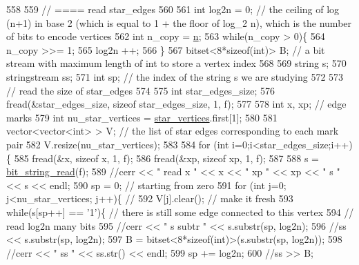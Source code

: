 \begin{DoxyCode}
558 
559   \textcolor{comment}{// ==== read star\_edges}
560 
561   \textcolor{keywordtype}{int} log2n = 0; \textcolor{comment}{// the ceiling of log (n+1) in base 2 (which is equal to 1 + the floor of log\_2 n), which
       is the number of bits to encode vertices}
562   \textcolor{keywordtype}{int} n\_copy = \hyperlink{classmarked__graph__compressed_a8d841016ddb11cfd33748c8deb6277ba}{n};
563   \textcolor{keywordflow}{while}(n\_copy > 0)\{
564     n\_copy >>= 1;
565     log2n ++;
566   \}
567   bitset<8*sizeof(int)> B; \textcolor{comment}{// a bit stream with maximum length of int to store a vertex index}
568 
569   \textcolor{keywordtype}{string} s;
570   stringstream ss;
571   \textcolor{keywordtype}{int} sp; \textcolor{comment}{// the index of the string s we are studying }
572 
573   \textcolor{comment}{// read the size of star\_edges}
574 
575   \textcolor{keywordtype}{int} star\_edges\_size;
576   fread(&star\_edges\_size, \textcolor{keyword}{sizeof} star\_edges\_size, 1, f);
577 
578   \textcolor{keywordtype}{int} x, xp; \textcolor{comment}{// edge marks}
579   \textcolor{keywordtype}{int} nu\_star\_vertices = \hyperlink{classmarked__graph__compressed_a7a4ced4586e2e353f9076bd447df5208}{star\_vertices}.first[1];
580 
581   vector<vector<int> > V; \textcolor{comment}{// the list of star edges corresponding to each mark pair}
582   V.resize(nu\_star\_vertices);
583 
584   \textcolor{keywordflow}{for} (\textcolor{keywordtype}{int} i=0;i<star\_edges\_size;i++)\{
585     fread(&x, \textcolor{keyword}{sizeof} x, 1, f);
586     fread(&xp, \textcolor{keyword}{sizeof} xp, 1, f);
587   
588     s = \hyperlink{compression__helper_8cpp_a40e8dcbc036f96b28e003e882c4890b7}{bit\_string\_read}(f);
589     \textcolor{comment}{//cerr << " read  x " << x << " xp " << xp << " s " << s << endl;}
590     sp = 0; \textcolor{comment}{// starting from zero }
591     \textcolor{keywordflow}{for} (\textcolor{keywordtype}{int} j=0; j<nu\_star\_vertices; j++)\{ \textcolor{comment}{// }
592       V[j].clear(); \textcolor{comment}{// make it fresh}
593       \textcolor{keywordflow}{while}(s[sp++] == \textcolor{charliteral}{'1'})\{ \textcolor{comment}{// there is still some edge connected to this vertex }
594         \textcolor{comment}{// read log2n many bits}
595         \textcolor{comment}{//cerr << " s subtr " << s.substr(sp, log2n);}
596         \textcolor{comment}{//ss << s.substr(sp, log2n);}
597         B = bitset<8*sizeof(int)>(s.substr(sp, log2n));
598         \textcolor{comment}{//cerr << " ss " << ss.str() << endl;}
599         sp += log2n;
600         \textcolor{comment}{//ss >> B;}

\end{DoxyCode}
